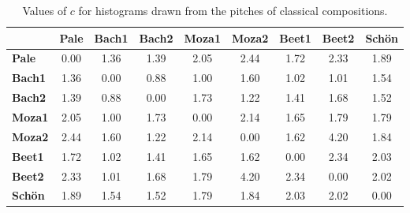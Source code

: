 \begin{table}[h!]
\scriptsize
\begin{center}
\begin{tabular}{| l | c || c | c || c | c || c | c || c |}\hline
 & {\bf Pale} & {\bf Bach1} & {\bf Bach2} & {\bf Moza1} & {\bf Moza2} & {\bf Beet1} & {\bf Beet2} & {\bf Sch\"on} \\\hline
{\bf Pale} & 0.00 & 1.36 & 1.39 & 2.05 & 2.44 & 1.72 & 2.33 & 1.89 \\\hline\hline
{\bf Bach1} & 1.36 & 0.00 & 0.88 & 1.00 & 1.60 & 1.02 & 1.01 & 1.54 \\\hline
{\bf Bach2} & 1.39 & 0.88 & 0.00 & 1.73 & 1.22 & 1.41 & 1.68 & 1.52 \\\hline\hline
{\bf Moza1} & 2.05 & 1.00 & 1.73 & 0.00 & 2.14 & 1.65 & 1.79 & 1.79 \\\hline
{\bf Moza2} & 2.44 & 1.60 & 1.22 & 2.14 & 0.00 & 1.62 & 4.20 & 1.84 \\\hline\hline
{\bf Beet1} & 1.72 & 1.02 & 1.41 & 1.65 & 1.62 & 0.00 & 2.34 & 2.03 \\\hline
{\bf Beet2} & 2.33 & 1.01 & 1.68 & 1.79 & 4.20 & 2.34 & 0.00 & 2.02 \\\hline\hline
{\bf Sch\"on} & 1.89 & 1.54 & 1.52 & 1.79 & 1.84 & 2.03 & 2.02 & 0.00 \\\hline
\end{tabular}
\caption{Values of $c$ for histograms drawn from the pitches of classical compositions.}
\end{center}
\end{table}